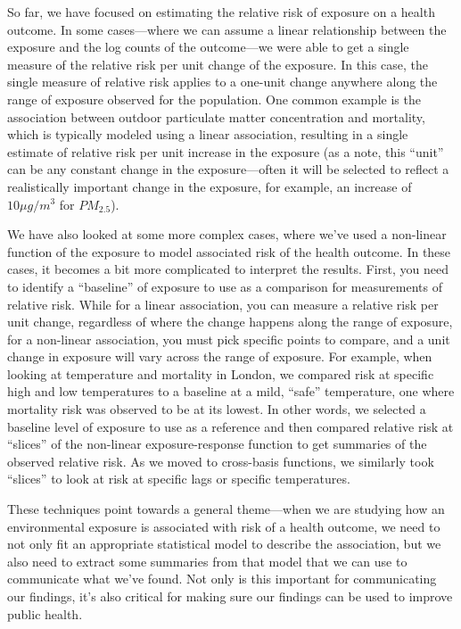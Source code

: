 \documentclass[
]{book}
\begin{document}
So far, we have focused on estimating the relative risk of exposure on a health outcome. In some cases---where we can assume a linear relationship between the exposure and the log counts of the outcome---we were able to get a single measure of the relative risk per unit change of the exposure. In this case, the single measure of relative risk applies to a one-unit change anywhere along the range of exposure observed for the population. One common example is the association between outdoor particulate matter concentration and mortality, which is typically modeled using a linear association, resulting in a single estimate of relative risk per unit increase in the exposure (as a note, this ``unit'' can be any constant change in the exposure---often it will be selected to reflect a realistically important change in the exposure, for example, an increase of \(10 \mu g/m^3\) for \(PM_{2.5}\)).

We have also looked at some more complex cases, where we've used a non-linear function of the exposure to model associated risk of the health outcome. In these cases, it becomes a bit more complicated to interpret the results. First, you need to identify a ``baseline'' of exposure to use as a comparison for measurements of relative risk. While for a linear association, you can measure a relative risk per unit change, regardless of where the change happens along the range of exposure, for a non-linear association, you must pick specific points to compare, and a unit change in exposure will vary across the range of exposure. For example, when looking at temperature and mortality in London, we compared risk at specific high and low temperatures to a baseline at a mild, ``safe'' temperature, one where mortality risk was observed to be at its lowest. In other words, we selected a baseline level of exposure to use as a reference and then compared relative risk at ``slices'' of the non-linear exposure-response function to get summaries of the observed relative risk. As we moved to cross-basis functions, we similarly took ``slices'' to look at risk at specific lags or specific temperatures.

These techniques point towards a general theme---when we are studying how an environmental exposure is associated with risk of a health outcome, we need to not only fit an appropriate statistical model to describe the association, but we also need to extract some summaries from that model that we can use to communicate what we've found. Not only is this important for communicating our findings, it's also critical for making sure our findings can be used to improve public health.
\end{document}
